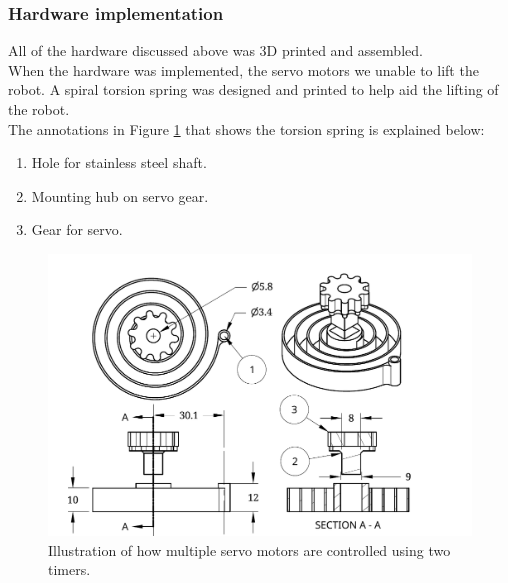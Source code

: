 \subsubsection{Hardware implementation}

All of the hardware discussed above was 3D printed and assembled.\\

When the hardware was implemented, the servo motors we unable to lift the robot. A spiral torsion spring was designed and printed to help aid the lifting of the robot.\\

The annotations in Figure \ref{fig:DrawingSpring} that shows the torsion spring is explained below:
\begin{enumerate}
\item Hole for stainless steel shaft.
\item Mounting hub on servo gear.
\item Gear for servo.
\end{enumerate}

\begin{figure}[H]
\centering
\includegraphics[scale = 0.8]{pics/DrawingSpring.pdf}
\caption{Illustration of how multiple servo motors are controlled using two timers.}
\label{fig:DrawingSpring}
\end{figure}